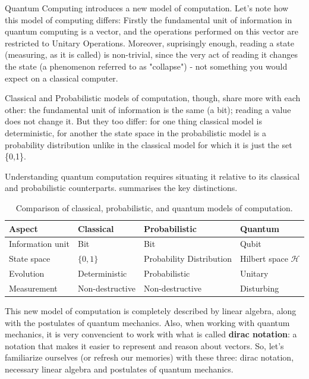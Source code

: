 \documentclass[12pt, a4paper, oneside]{report}
\theoremstyle{plain}
\theoremstyle{definition}
\theoremstyle{remark}
\newcommand{\Hcal}{\mathcal{H}}
\begin{document}
Quantum Computing introduces a new model of computation. Let's note how this model of computing differs: Firstly the fundamental unit of information in quantum computing is a vector, and the operations performed on this vector are restricted to Unitary Operations. Moreover, suprisingly enough, reading a state (measuring, as it is called) is non-trivial, since the very act of reading it changes the state (a phenomenon referred to as "collapse") - not something you would expect on a classical computer. 

Classical and Probabilistic models of computation, though, share more with each other: the fundamental unit of information is the same (a bit); reading a value does not change it. But they too differ: for one thing classical model is deterministic, for another the state space in the probabilistic model is a probability distribution unlike in the classical model for which it is just the set \{0,1\}. 

Understanding quantum computation requires situating it relative to its classical and
probabilistic counterparts.  summarises the key distinctions.

\begin{table}[h]
\centering
\caption{Comparison of classical, probabilistic, and quantum models of computation.}
\label{tab:models}
\begin{tabularx}{\linewidth}{lXXX}
\toprule
\textbf{Aspect} & \textbf{Classical} & \textbf{Probabilistic} & \textbf{Quantum} \\
\midrule
Information unit & Bit & Bit & Qubit \\
State space      & $\{0,1\}$ & Probability Distribution &  Hilbert space $\Hcal$ \\
Evolution        & Deterministic & Probabilistic &  Unitary \\
Measurement      & Non-destructive & Non-destructive & Disturbing \\
\bottomrule
\end{tabularx}
\end{table}

This new model of computation is completely described by linear algebra, along with the postulates of quantum mechanics. Also, when working with quantum mechanics, it is very convencient to work with what is called \textbf{dirac notation}: a notation that makes it easier to represent and reason about vectors. So, let's familiarize  ourselves (or refresh our memories) with these three: dirac notation, necessary linear algebra and postulates of quantum mechanics.
\end{document}
